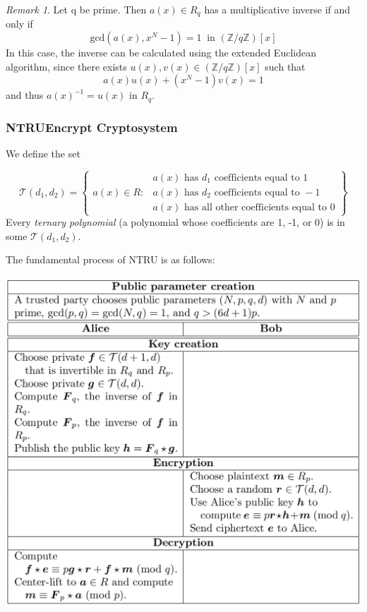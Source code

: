 \documentclass[10pt,a4paper]{article}
\theoremstyle{remark}
\newtheorem*{remark}{Remark}
\begin{document}
\begin{remark}
Let q be prime. Then $a(x)\in R_q$ has a multiplicative inverse if and only if
$$\text{gcd}(a(x),x^N-1)=1\: \text{ in }(\mathbb{Z}/q\mathbb{Z})[x]$$
In this case, the inverse can be calculated using the extended Euclidean algorithm, since there exists $u(x),v(x)\in(\mathbb{Z}/q\mathbb{Z})[x]$ such that
$$a(x)u(x)+(x^N-1)v(x)=1$$
and thus $a(x)^{-1}=u(x)$ in $R_q$.
\end{remark}

\subsubsection{NTRUEncrypt Cryptosystem}
We define the set

$$\mathcal{T}\left(d_{1}, d_{2}\right)=\left\{\begin{array}{ll}
& a(x) \text { has } d_{1} \text { coefficients equal to } 1 \\
a(x) \in R: & a(x) \text { has } d_{2} \text { coefficients equal to }-1 \\
& a(x) \text { has all other coefficients equal to }0
\end{array}\right\}$$
Every \textit{ternary polynomial} (a polynomial whose coefficients are 1, -1, or 0) is in some $\mathcal{T}(d_1,d_2)$.

The fundamental process of NTRU is as follows:

\includegraphics[scale=.2]{NTRU.png}
\end{document}
